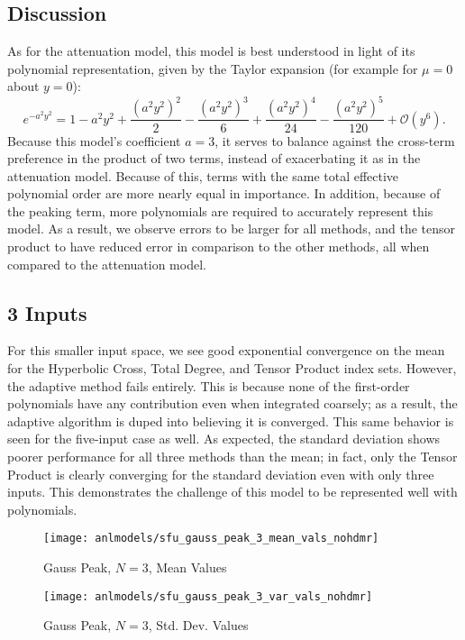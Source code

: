 \subsection{Discussion}
As for the attenuation model, this model is best understood in light of its polynomial representation, given
by the Taylor expansion (for example for $\mu=0$ about $y=0$):
\begin{equation}
e^{-a^2y^2} = 1 - a^2y^2 + \frac{(a^2y^2)^2}{2} - \frac{(a^2y^2)^3}{6} + \frac{(a^2y^2)^4}{24} - \frac{(a^2y^2)^5}{120} + \mathcal{O}(y^6).
\end{equation}
Because this model's coefficient $a=3$, it serves to balance against the cross-term preference in the product
of two terms, instead of exacerbating it as in the attenuation model.  Because of this, terms with the same total
effective polynomial order are more nearly equal in importance.  In addition, because of the peaking term,
more polynomials are required to accurately represent this model.  As a result, we observe errors to be larger
for all methods, and the tensor product to have reduced error in comparison to the other methods, all when
compared to the attenuation model.

\subsection{3 Inputs}
For this smaller input space, we see good exponential convergence on the mean for the Hyperbolic Cross, Total
Degree, and Tensor Product index sets.  However, the adaptive method fails entirely.  This is because none of
the first-order polynomials have any contribution even when integrated coarsely; as a result, the adaptive
algorithm is duped into believing it is converged.  This same behavior is seen for the five-input case as
well.  As expected, the standard deviation shows poorer performance for all three methods than the mean; in
fact, only the Tensor Product is clearly converging for the standard deviation even with only three inputs.
This demonstrates the challenge of this model to be represented well with polynomials.
\begin{figure}[H]
  \centering
  \texttt{[image: anlmodels/sfu\_gauss\_peak\_3\_mean\_vals\_nohdmr]}
  \caption{Gauss Peak, $N=3$, Mean Values}
  \label{fig:gauss peak mean values 3}
\end{figure}
\begin{figure}[H]
  \centering
  \texttt{[image: anlmodels/sfu\_gauss\_peak\_3\_var\_vals\_nohdmr]}
  \caption{Gauss Peak, $N=3$, Std. Dev. Values}
  \label{fig:gauss peak var values 3}
\end{figure}

